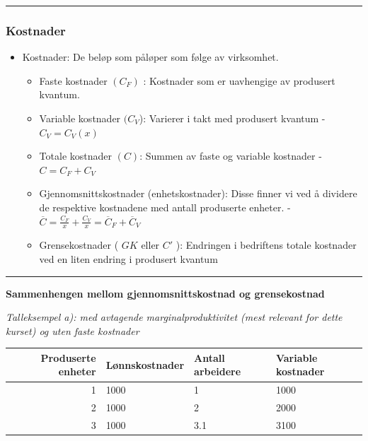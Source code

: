 \documentclass[
  letterpaper,
  DIV=11,
  numbers=noendperiod]{scrartcl}
\providecommand{\tightlist}{%
  \setlength{\itemsep}{0pt}\setlength{\parskip}{0pt}}\usepackage{longtable,booktabs,array}
\begin{document}
\begin{center}\rule{0.5\linewidth}{0.5pt}\end{center}

\subsubsection{Kostnader}\label{kostnader}

\begin{itemize}
\tightlist
\item
  Kostnader: De beløp som påløper som følge av virksomhet.

  \begin{itemize}
  \tightlist
  \item
    Faste kostnader \((C_F)\) : Kostnader som er uavhengige av produsert
    kvantum.
  \item
    Variable kostnader \((C_V\)): Varierer i takt med produsert kvantum
    - \(C_V = C_{V}(x)\)
  \item
    Totale kostnader \((C)\): Summen av faste og variable kostnader -
    \(C = C_F + C_V\)
  \item
    Gjennomsnittskostnader (enhetskostnader): Disse finner vi ved å
    dividere de respektive kostnadene med antall produserte enheter. -
    \(\overline{C}=\frac{C_F}{x}+\frac{C_V}{x}=\overline{C}_F+\overline{C}_V\)
  \item
    Grensekostnader ( \(GK\) eller \(C'\) ): Endringen i bedriftens
    totale kostnader ved en liten endring i produsert kvantum
  \end{itemize}
\end{itemize}

\begin{center}\rule{0.5\linewidth}{0.5pt}\end{center}

\textbf{Sammenhengen mellom gjennomsnittskostnad og grensekostnad}

\emph{Talleksempel a): med avtagende marginalproduktivitet (mest
relevant for dette kurset) og uten faste kostnader}

\begin{tabular}[t]{r|l|l|l}
\hline
Produserte enheter & Lønnskostnader & Antall arbeidere & Variable kostnader\\
\hline
1 & 1000 & 1 & 1000\\
\hline
2 & 1000 & 2 & 2000\\
\hline
3 & 1000 & 3.1 & 3100\\
\hline
\end{tabular}
\end{document}
